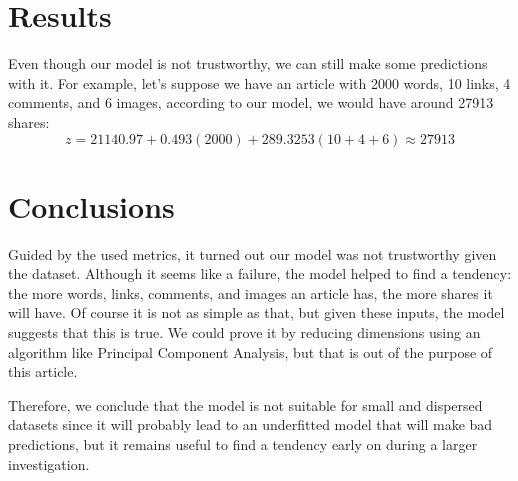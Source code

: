 \documentclass[10pt]{article}
\begin{document}
\section{Results}
Even though our model is not trustworthy, we can still make some predictions with it. For example, let's suppose we have an article with 2000 words, 10 links, 4 comments, and 6 images, according to our model, we would have around 27913 shares:
\begin{equation*}
  z = 21140.97 + 0.493(2000) + 289.3253(10+4+6) \approx 27913
\end{equation*}

\section{Conclusions}
Guided by the used metrics, it turned out our model was not trustworthy given the dataset. Although it seems like a failure, the model helped to find a tendency: the more words, links, comments, and images an article has, the more shares it will have. Of course it is not as simple as that, but given these inputs, the model suggests that this is true. We could prove it by reducing dimensions using an algorithm like Principal Component Analysis, but that is out of the purpose of this article. \par
Therefore, we conclude that the model is not suitable for small and dispersed datasets since it will probably lead to an underfitted model that will make bad predictions, but it remains useful to find a tendency early on during a larger investigation.



\end{document}
